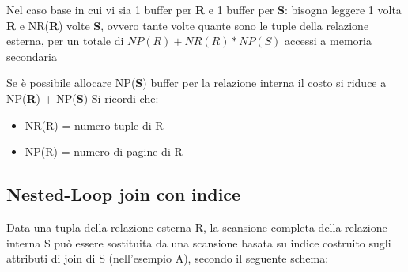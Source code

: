 \documentclass[a4paper, 10pt]{article}
\theoremstyle{definition}
\begin{document}
				\noindent
				Nel caso base in cui vi sia 1 buffer per \textbf{R} e 1 buffer per \textbf{S}:
				bisogna leggere 1 volta \textbf{R} e NR(\textbf{R}) volte \textbf{S}, 
				ovvero tante volte quante sono le tuple della relazione esterna,
				per un totale di $ NP(R) + NR(R) * NP(S) $ accessi a memoria secondaria
				
				\noindent
				Se è possibile allocare NP(\textbf{S}) buffer per la relazione interna
				il costo si riduce a NP(\textbf{R}) + NP(\textbf{S})
				Si ricordi che:
				\begin{itemize}[label={}]
					\item NR(R) = numero tuple di R
					\item NP(R) = numero di pagine di R
				\end{itemize}
				
		\subsection*{Nested-Loop join con indice}
			Data una tupla della relazione esterna R, la scansione completa della relazione interna S può
			essere sostituita da una scansione basata su indice costruito sugli attributi di join di S (nell'esempio A),
			secondo il seguente schema:
			
\end{document}
